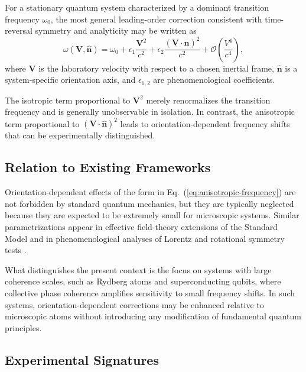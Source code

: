 \documentclass[11pt]{article}
\begin{document}
            For a stationary quantum system characterized by a dominant transition frequency $\omega_0$, the most general leading-order correction consistent with time-reversal symmetry and analyticity may be written as
            \begin{equation}
                \omega(\mathbf{V},\hat{\mathbf{n}}) =
                \omega_0
                + \epsilon_1 \frac{\mathbf{V}^2}{c^2}
                + \epsilon_2 \frac{(\mathbf{V}\cdot\hat{\mathbf{n}})^2}{c^2}
                + \mathcal{O}\!\left(\frac{V^4}{c^4}\right),
                \label{eq:anisotropic-frequency}
            \end{equation}
            where $\mathbf{V}$ is the laboratory velocity with respect to a chosen inertial frame, $\hat{\mathbf{n}}$ is a system-specific orientation axis, and $\epsilon_{1,2}$ are phenomenological coefficients.

            The isotropic term proportional to $\mathbf{V}^2$ merely renormalizes the transition frequency and is generally unobservable in isolation. In contrast, the anisotropic term proportional to $(\mathbf{V}\cdot\hat{\mathbf{n}})^2$ leads to orientation-dependent frequency shifts that can be experimentally distinguished.

        \subsection{Relation to Existing Frameworks}

            Orientation-dependent effects of the form in Eq.~(\ref{eq:anisotropic-frequency}) are not forbidden by standard quantum mechanics, but they are typically neglected because they are expected to be extremely small for microscopic systems. Similar parametrizations appear in effective field-theory extensions of the Standard Model and in phenomenological analyses of Lorentz and rotational symmetry tests \cite{Kostelecky1995,Mattingly2005}.

            What distinguishes the present context is the focus on systems with large coherence scales, such as Rydberg atoms and superconducting qubits, where collective phase coherence amplifies sensitivity to small frequency shifts. In such systems, orientation-dependent corrections may be enhanced relative to microscopic atoms without introducing any modification of fundamental quantum principles.

        \subsection{Experimental Signatures}
\end{document}
